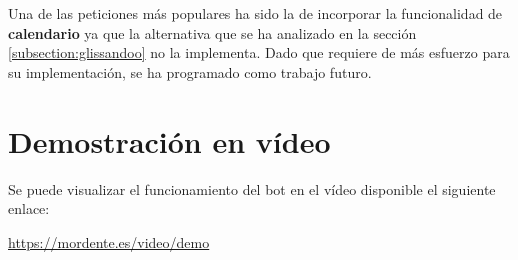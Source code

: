 Una de las peticiones más populares ha sido la de incorporar la funcionalidad de \textbf{calendario} ya que la alternativa que se ha analizado en la sección \ref{subsection:glissandoo} no la implementa. Dado que requiere de más esfuerzo para su implementación, se ha programado como trabajo futuro.


\section{Demostración en vídeo}

Se puede visualizar el funcionamiento del bot en el vídeo disponible el siguiente enlace:

\url{https://mordente.es/video/demo}

